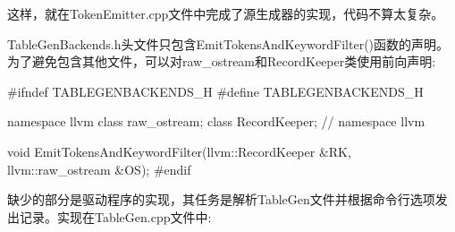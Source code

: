 这样，就在TokenEmitter.cpp文件中完成了源生成器的实现，代码不算太复杂。

TableGenBackends.h头文件只包含EmitTokensAndKeywordFilter()函数的声明。为了避免包含其他文件，可以对raw\_ostream和RecordKeeper类使用前向声明:

\begin{cpp}
#ifndef TABLEGENBACKENDS_H
#define TABLEGENBACKENDS_H

namespace llvm {
    class raw_ostream;
    class RecordKeeper;
} // namespace llvm

void EmitTokensAndKeywordFilter(llvm::RecordKeeper &RK,
                                llvm::raw_ostream &OS);
#endif
\end{cpp}

缺少的部分是驱动程序的实现，其任务是解析TableGen文件并根据命令行选项发出记录。实现在TableGen.cpp文件中:

